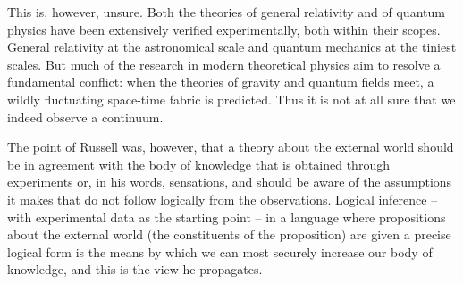 \documentclass{article}
\begin{document}
This is, however, unsure. Both the theories of general relativity and of quantum physics have been extensively verified experimentally, both within their scopes. General relativity at the astronomical scale and quantum mechanics at the tiniest scales. But much of the research in modern theoretical physics aim to resolve a fundamental conflict: when the theories of gravity and quantum fields meet, a wildly fluctuating space-time fabric is predicted. Thus it is not at all sure that we indeed observe a continuum. 

The point of Russell was, however, that a theory about the external world should be in agreement with the body of knowledge that is obtained through experiments or, in his words, sensations, and should be aware of the assumptions it makes that do not follow logically from the observations. Logical inference -- with experimental data as the starting point -- in a language where propositions about the external world (the constituents of the proposition) are given a precise logical form is the means by which we can most securely increase our body of knowledge, and this is the view he propagates.
\end{document}
